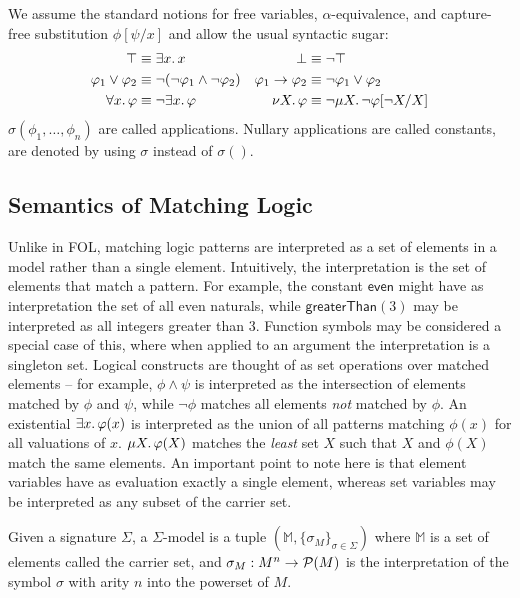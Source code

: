 We assume the standard notions for free variables, \(\alpha\)-equivalence, and capture-free substitution \(\phi[\psi/x]\)
and allow the usual syntactic sugar:
\begin{align*}
                       \top &\equiv \exists x \ldotp x &
                       \bot &\equiv \lnot \top \\
         \phi_1 \lor \phi_2 &\equiv \lnot(\lnot\phi_1 \land \lnot\phi_2) &
    \phi_1 \limplies \phi_2 &\equiv \lnot \phi_1 \lor \phi_2 \\
      \forall x \ldotp \phi &\equiv \lnot \exists x \ldotp \phi &
      \nu X \ldotp \phi &\equiv \lnot \mu X \ldotp \lnot \phi[\lnot X/X]
\end{align*}
\(\sigma(\phi_1, \dots, \phi_n)\) are called applications.
Nullary applications are called constants, are denoted by using \(\sigma\) instead of \(\sigma()\).

\hypertarget{sec:semantics-of-matching-logic}{%
\subsection{Semantics of Matching Logic}\label{sec:semantics-of-matching-logic}}

Unlike in FOL, matching logic patterns are interpreted as a set of elements in a model rather than a single element.
Intuitively, the interpretation is the set of elements that match a pattern.
For example, the constant \(\mathsf{even}\) might have as interpretation the set of all even naturals,
while \(\mathsf{greaterThan}(3)\) may be interpreted as all integers greater than \(3\).
Function symbols may be considered a special case of this, where when applied to an argument the interpretation is a singleton set.
Logical constructs are thought of as set operations over matched elements
-- for example, \(\phi \land \psi\) is interpreted as the intersection of elements matched by \(\phi\) and \(\psi\),
while \(\lnot \phi\) matches all elements \emph{not} matched by \(\phi\).
An existential \(\exists x \ldotp \phi(x)\) is interpreted as the union of all patterns matching \(\phi(x)\) for all valuations of \(x\).
\(\mu X \ldotp \phi(X)\) matches the \emph{least} set \(X\) such that \(X\) and \(\phi(X)\) match the same elements.
An important point to note here is that element variables have as evaluation exactly a single element,
whereas set variables may be interpreted as any subset of the carrier set.

\begin{definition}Given a signature \(\Sigma\), a \(\Sigma\)-model is a tuple \((\mathbb M, \{ \sigma_M \}_{\sigma \in \Sigma} )\)
where \(\mathbb M\) is a set of elements called the carrier set,
and \(\sigma_M : M^n \to \powerset(M)\) is the interpretation of the symbol \(\sigma\) with arity \(n\) into the powerset of \(M\).\end{definition}

